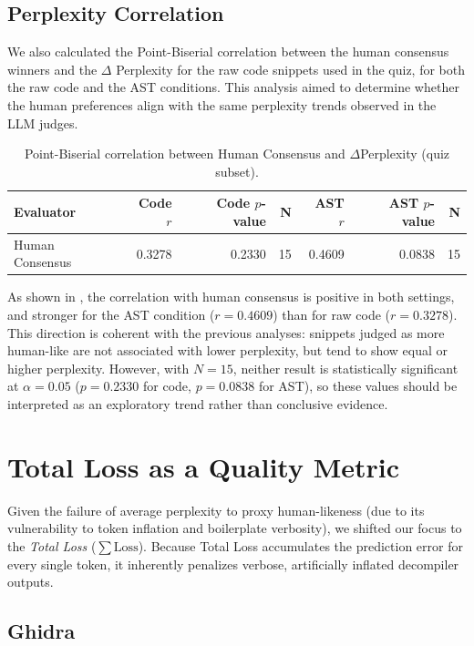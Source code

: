 \subsection{Perplexity Correlation}

We also calculated the Point-Biserial correlation between the human consensus winners and the $\Delta$ Perplexity for the raw code snippets used in the quiz, for both the raw code and the \ac{AST} conditions. This analysis aimed to determine whether the human preferences align with the same perplexity trends observed in the LLM judges.
\begin{table}
\centering
\caption{Point-Biserial correlation between Human Consensus and $\Delta$Perplexity (quiz subset).}\label{tab:human_ppl_correlation}
\begin{tabular}{lrrrrrr}
\toprule
\textbf{Evaluator} & \textbf{Code $r$} & \textbf{Code $p$-value} & \textbf{N} & \textbf{AST $r$} & \textbf{AST $p$-value} & \textbf{N} \\
\midrule
Human Consensus & 0.3278 & 0.2330 & 15 & 0.4609 & 0.0838 & 15 \\
\bottomrule
\end{tabular}
\end{table}

As shown in , the correlation with human consensus is positive in both settings, and stronger for the \ac{AST} condition ($r=0.4609$) than for raw code ($r=0.3278$). 
This direction is coherent with the previous analyses: snippets judged as more human-like are not associated with lower perplexity, but tend to show equal or higher perplexity. However, with $N=15$, neither result is statistically significant at $\alpha=0.05$ ($p=0.2330$ for code, $p=0.0838$ for \ac{AST}), so these values should be interpreted as an exploratory trend rather than conclusive evidence.


\section{Total Loss as a Quality Metric}

Given the failure of average perplexity to proxy human-likeness (due to its vulnerability to token inflation and boilerplate verbosity), we shifted our focus to the \emph{Total Loss} ($\sum \mathrm{Loss}$). Because Total Loss accumulates the prediction error for every single token, it inherently penalizes verbose, artificially inflated decompiler outputs. 

\subsection{Ghidra}

